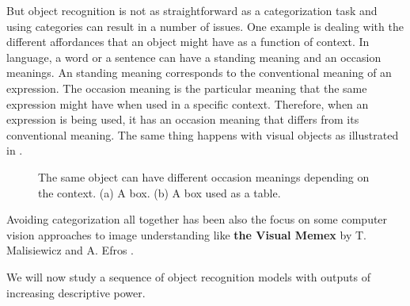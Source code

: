 But object recognition is not as straightforward as a categorization task and using categories can result in a number of issues. One example is dealing with the different affordances that an object might have as a function of context.
In language, a word or a sentence can have a standing meaning and an occasion meanings. An standing meaning corresponds to the conventional meaning of an expression. The occasion meaning is the particular meaning that the same expression might have when used in a specific context. Therefore, when an expression is being used, it has an occasion meaning that differs from its conventional meaning. The same thing happens with visual objects as illustrated in \fig{\ref{fig:box_table}}.

\begin{figure}
\centerline{
}
\caption{The same object can have different occasion meanings depending on the context. (a) A box. (b) A box used as a table.}
\label{fig:box_table}
\end{figure}

Avoiding categorization all together has been also the focus on some computer vision approaches to image understanding like {\bf the Visual Memex} by T. Malisiewicz and A. Efros \cite{malisiewicz-nips09}. 

We will now study a sequence of object recognition models with outputs of increasing descriptive power.



